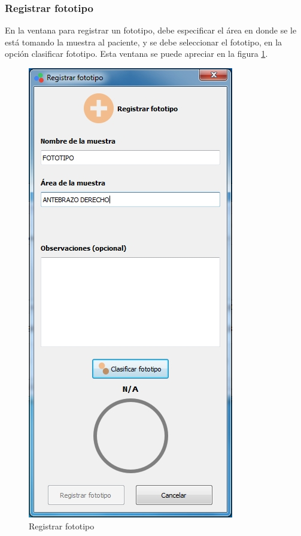 		\subsubsection*{Registrar fototipo}
		
		En la ventana para registrar un fototipo, debe especificar el \'{a}rea en donde se le est\'{a} tomando la muestra al paciente, y se debe seleccionar el fototipo, en la opci\'{o}n clasificar fototipo. Esta ventana se puede apreciar en la figura \ref{fig:registrar-fototipo}.
		
\begin{figure}[H]
  \centering
  \includegraphics[width=.5\linewidth]{./img/registrar-fototipo1.jpg}
\caption[]{Registrar fototipo\label{fig:registrar-fototipo}}
\end{figure}

